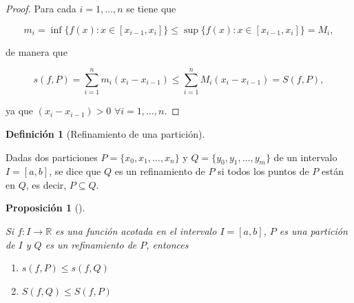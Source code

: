 \documentclass[
  a4paper,
]{scrreport}
\providecommand{\tightlist}{%
  \setlength{\itemsep}{0pt}\setlength{\parskip}{0pt}}\usepackage{longtable,booktabs,array}
\theoremstyle{definition}
\theoremstyle{plain}
\theoremstyle{definition}
\newtheorem{definition}{Definición}[chapter]
\theoremstyle{definition}
\theoremstyle{plain}
\theoremstyle{plain}
\newtheorem{proposition}{Proposición}[chapter]
\theoremstyle{remark}
\begin{document}
\begin{tcolorbox}[enhanced jigsaw, leftrule=.75mm, colbacktitle=quarto-callout-note-color!10!white, toprule=.15mm, opacityback=0, opacitybacktitle=0.6, toptitle=1mm, breakable, bottomtitle=1mm, colframe=quarto-callout-note-color-frame, rightrule=.15mm, titlerule=0mm, title=\textcolor{quarto-callout-note-color}{\faInfo}\hspace{0.5em}{Demostración}, arc=.35mm, left=2mm, bottomrule=.15mm, colback=white, coltitle=black]

\begin{proof}
Para cada \(i=1,\ldots,n\) se tiene que

\[
m_i=\inf\{f(x): x\in[x_{i-1},x_i]\}\leq \sup\{f(x): x\in[x_{i-1},x_i]\} = M_i,
\]

de manera que

\[
s(f,P) = \sum_{i=1}^n m_i(x_i-x_{i-1}) \leq \sum_{i=1}^n M_i(x_i-x_{i-1}) = S(f,P),
\]

ya que \((x_i-x_{i-1})>0\) \(\forall i=1,\ldots,n\).
\end{proof}

\end{tcolorbox}

\begin{definition}[Refinamiento de una
partición]\protect\hypertarget{def-refinamiento-particion}{}\label{def-refinamiento-particion}

Dadas dos particiones \(P=\{x_0, x_1, \ldots, x_n\}\) y
\(Q=\{y_0, y_1, \ldots, y_m\}\) de un intervalo \(I=[a,b]\), se dice que
\(Q\) es un refinamiento de \(P\) si todos los puntos de \(P\) están en
\(Q\), es decir, \(P\subseteq Q\).

\end{definition}

\begin{proposition}[]\protect\hypertarget{prp-sumas-riemann-refinamiento}{}\label{prp-sumas-riemann-refinamiento}

Si \(f:I\to\mathbb{R}\) es una función acotada en el intervalo
\(I=[a,b]\), \(P\) es una partición de \(I\) y \(Q\) es un refinamiento
de \(P\), entonces

\begin{enumerate}
\def\labelenumi{\alph{enumi}.}
\tightlist
\item
  \(s(f,P)\leq s(f,Q)\)
\item
  \(S(f,Q)\leq S(f,P)\)
\end{enumerate}

\end{proposition}
\end{document}
